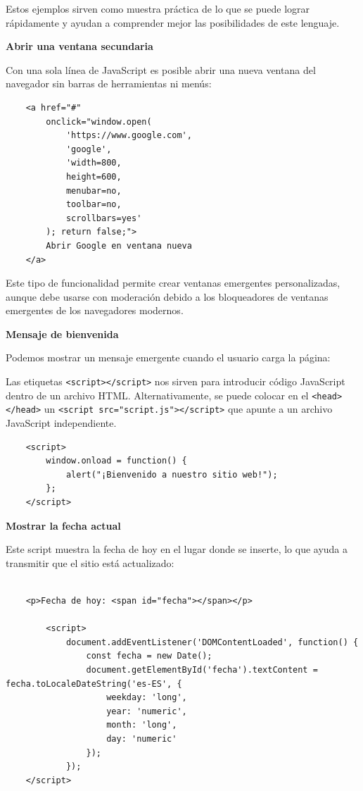 \documentclass[11.5pt]{article}
\begin{document}
	Estos ejemplos sirven como muestra práctica de lo que se puede lograr rápidamente y ayudan a comprender mejor las posibilidades de este lenguaje.
	
	\noindent\textbf{{\small Abrir una ventana secundaria}}
	
	Con una sola línea de JavaScript es posible abrir una nueva ventana del navegador sin barras de herramientas ni menús:
	
	\begin{verbatim}
	<a href="#" 
		onclick="window.open(
			'https://www.google.com',
			'google',
			'width=800,
			height=600,
			menubar=no,
			toolbar=no,
			scrollbars=yes'
		); return false;">
		Abrir Google en ventana nueva 
	</a>
	\end{verbatim}
	
	Este tipo de funcionalidad permite crear ventanas emergentes personalizadas, aunque debe usarse con moderación debido a los bloqueadores de ventanas emergentes de los navegadores modernos.
	
	\noindent\textbf{{\small Mensaje de bienvenida}}
	
	Podemos mostrar un mensaje emergente cuando el usuario carga la página:
	
	Las etiquetas \verb|<script></script>| nos sirven para introducir código JavaScript dentro de un archivo HTML. Alternativamente, se puede colocar en el \verb|<head></head>| un \verb|<script src="script.js"></script>| que apunte a un archivo JavaScript independiente.
	
	\begin{verbatim}
	<script>
		window.onload = function() {
			alert("¡Bienvenido a nuestro sitio web!");
		};
	</script>
	\end{verbatim}
	
	\noindent\textbf{{\small Mostrar la fecha actual}}
	
	Este script muestra la fecha de hoy en el lugar donde se inserte, lo que ayuda a transmitir que el sitio está actualizado:
	
	\begin{verbatim}
	
	<p>Fecha de hoy: <span id="fecha"></span></p>
	
		<script>
			document.addEventListener('DOMContentLoaded', function() {
				const fecha = new Date();
				document.getElementById('fecha').textContent = fecha.toLocaleDateString('es-ES', {
					weekday: 'long',
					year: 'numeric',
					month: 'long',
					day: 'numeric'
				});
			});
	</script>
	\end{verbatim}
	
\end{document}
